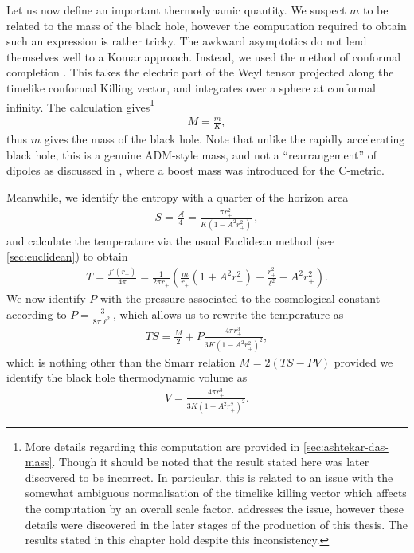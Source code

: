 \documentclass[
twoside,
openright,
frontopenright,
]{dmathesis}
\begin{document}
Let us now define an important thermodynamic quantity. We suspect $m$ to be
related to the mass of the black hole, however the computation required to
obtain such an expression is rather tricky. The awkward asymptotics do not lend
themselves well to a Komar approach. Instead, we used the method of conformal
completion \cite{Ashtekar:1984zz, Ashtekar:1999jx, Das:2000cu}. This takes the
electric part of the Weyl tensor projected along the timelike conformal Killing
vector, and integrates over a sphere at conformal infinity. The calculation
gives\footnote{More details regarding this computation are provided in
  \cref{sec:ashtekar-das-mass}. Though it should be noted that the result stated
  here was later discovered to be incorrect. In particular, this is related to
  an issue with the somewhat ambiguous normalisation of the timelike killing
  vector which affects the computation by an overall scale
  factor.  addresses the issue, however these details were
  discovered in the later stages of the production of this thesis. The results
  stated in this chapter hold despite this inconsistency.}
\begin{align}
  M = \frac{m}{K},
  \label{eq:massAcc}
\end{align}
thus $m$ gives the mass of the black hole. Note that unlike the rapidly
accelerating black hole, this is a genuine ADM-style mass, and not a
``rearrangement'' of dipoles as discussed in \cite{Dutta:2005iy}, where a boost
mass was introduced for the C-metric.

Meanwhile, we identify the entropy with a quarter of the horizon 
area 
\begin{align}
  \label{eq:entropyFT}
S=\frac{\mathcal{A}}{4}=\frac{\pi r_+^2}{K(1-A^2r_+^2)}\,,
\end{align}
and calculate the temperature via the usual Euclidean method (see
\cref{sec:euclidean}) to obtain
\begin{align}\label{eq:Tuncharged}
T=\frac{f'(r_+)}{4\pi} = \frac{1}{2\pi r_+}\left(\frac{m}{r_+}\left(1+A^2r_+^2
\right) + \frac{r_+^2}{\ell^2} - A^2 r_+^2\right).
\end{align}
We now identify $P$ with the pressure associated to the cosmological constant
according to $P=\frac{3}{8\pi \ell^2}$, which allows us to rewrite the
temperature as
\begin{align}
TS = \frac{M}{2}+ P \frac{4\pi r_+^3}{3K (1-A^2r_+^2)^2},
\end{align}
which is nothing other than the Smarr relation $M= 2(TS - PV)$ provided we
identify the black hole thermodynamic volume as
\begin{align}\label{eq:Vuncharged}
V=\frac{4\pi r_+^3}{3K(1-A^2r_+^2)^2}.
\end{align}
\end{document}
